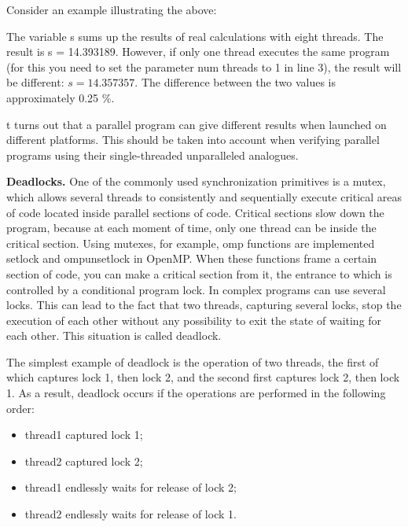 {	\par Consider an example illustrating the above:
	\begin{figure}[H]
		
	\end{figure}
	\par The variable s sums up the results of real calculations with eight threads. The result is s = 14.393189. However, if only one thread executes the same program (for this you need to set the parameter num \textunderscore threads to 1 in line 3), the result will be different: $s=14.357357$. The difference between the two values is approximately 0.25 \%.
	\par t turns out that a parallel program can give different results when launched on different platforms. This should be taken into account when verifying parallel programs using their single-threaded unparalleled analogues.
	\par\textbf{Deadlocks.} One of the commonly used synchronization primitives is a mutex, which allows several threads to consistently and sequentially execute critical areas of code located inside parallel sections of code. Critical sections slow down the program, because at each moment of time, only one thread can be inside the critical section. Using mutexes, for example, omp functions are implemented \textunderscore set\textunderscore lock and omp\textunderscore unset\textunderscore lock in OpenMP. When these functions frame a certain section of code, you can make a critical section from it, the entrance to which is controlled by a conditional program lock. In complex programs can use several locks. This can lead to the fact that two threads, capturing several locks, stop the execution of each other without any possibility to exit the state of waiting for each other. This situation is called deadlock.
	\par The simplest example of deadlock is the operation of two threads, the first of which captures lock 1, then lock 2, and the second first captures lock 2, then lock 1. As a result, deadlock occurs if the operations are performed in the following order:
	\begin{itemize}
\item thread1 captured lock 1;
\item thread2 captured lock 2;
\item thread1 endlessly waits for release of lock 2;
\item thread2 endlessly waits for release of lock 1.
	\end{itemize}
}
